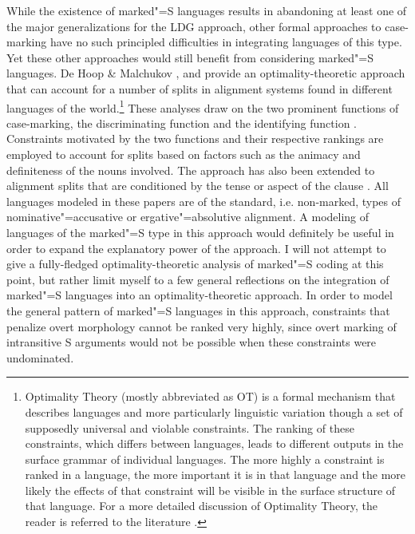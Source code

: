 While the existence of marked"=S languages results in abandoning at least one of the major generalizations for the LDG approach, other formal approaches to case-marking have no such principled difficulties in integrating languages of this type. 
Yet these other approaches would still benefit from considering marked"=S languages.
De Hoop \& Malchukov \citeyearpar{deHoop:2008}, \citet{Malchukov:2008} and \citet{Malchukov:2011} provide an optimality-theoretic approach that can account for a number of splits in alignment systems found in different languages of the world.\footnote{Optimality Theory (mostly abbreviated as OT) is a formal mechanism that describes languages and more particularly linguistic variation though a set of supposedly universal and violable constraints. 
The ranking of these constraints, which differs between languages, leads to different outputs in the surface grammar of individual languages. 
The more highly a constraint is ranked in a language, the more important it is in that language and the more likely the effects of that constraint will be visible in the surface structure of that language. 
For a more detailed discussion of Optimality Theory, the reader is referred to the literature \citep{PrinceSmolensky:2004,Kager:1999,Legendre:2001}.} 
These analyses draw on the two prominent functions of case-marking, the discriminating function and the identifying function \citep[91--939]{Mallinson:1981}. 
 Constraints motivated by the two functions and their respective rankings are employed to account for splits based on factors such as the animacy and definiteness of the nouns involved. 
The approach has also been extended to alignment splits that are conditioned by the tense or aspect of the clause \citep{Malchukov:2011,Malchukov.tam}. 
All languages modeled in these papers are of the standard, i.e. non-marked, types of nominative"=accusative or ergative"=absolutive alignment. 
A modeling of languages of the marked"=S type in this approach would definitely be useful in order to expand the explanatory power of the approach.
I will not attempt to give a fully-fledged optimality-theoretic analysis of marked"=S coding at this point, but rather limit myself to a few general reflections on the integration of marked"=S languages into an optimality-theoretic approach. 
In order to model the general pattern of marked"=S languages in this approach, constraints that penalize overt morphology cannot be ranked very highly, since overt marking of intransitive S arguments would not be possible when these constraints were undominated. 

